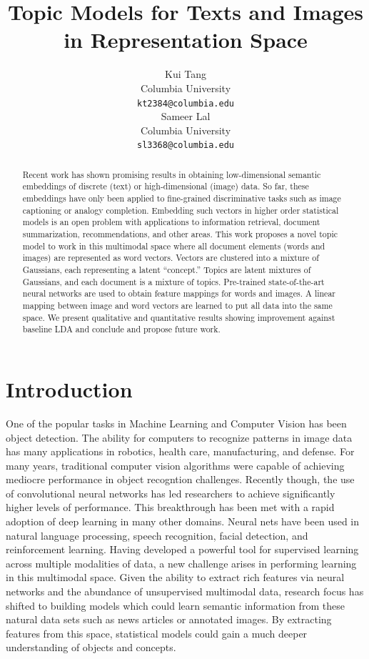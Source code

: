 \documentclass[11pt]{article}
\title{Topic Models for Texts and Images in Representation Space}
\author{Kui Tang \\
  Columbia University \\
  {\tt kt2384@columbia.edu} \\\And
  Sameer Lal \\
  Columbia University \\
  {\tt sl3368@columbia.edu} \\}
\date{}
\begin{document}
\maketitle

\begin{abstract}
Recent work has shown promising results in obtaining low-dimensional semantic embeddings of discrete (text) or high-dimensional (image) data. So far, these embeddings have only been applied to fine-grained discriminative tasks such as image captioning or analogy completion. Embedding such vectors in higher order statistical models is an open problem with applications to information retrieval, document summarization, recommendations, and other areas. This work proposes a novel topic model to work in this multimodal space where all document elements (words and images) are represented as word vectors. Vectors are clustered into a mixture of Gaussians, each representing a latent ``concept.'' Topics are latent mixtures of Gaussians, and each document is a mixture of topics. Pre-trained state-of-the-art neural networks are used to obtain feature mappings for words and images. A linear mapping between image and word vectors are learned to put all data into the same space. We present qualitative and quantitative results showing improvement against baseline LDA and conclude and propose future work.
\end{abstract}

\section{Introduction}
One of the popular tasks in Machine Learning and Computer Vision has been object detection. The ability for computers to recognize patterns in image data has many applications in robotics, health care, manufacturing, and defense. For many years, traditional computer vision algorithms were capable of achieving mediocre performance in object recogntion challenges. Recently though, the use of convolutional neural networks has led researchers to achieve significantly higher levels of performance. This breakthrough has been met with a rapid adoption of deep learning in many other domains. Neural nets have been used in natural language processing, speech recognition, facial detection, and reinforcement learning. Having developed a powerful tool for supervised learning across multiple modalities of data, a new challenge arises in performing learning in this multimodal space. Given the ability to extract rich features via neural networks and the abundance of unsupervised multimodal data, research focus has shifted to building models which could learn semantic information from these natural data sets such as news articles or annotated images. By extracting features from this space, statistical models could gain a much deeper understanding of objects and concepts. 
\end{document}
